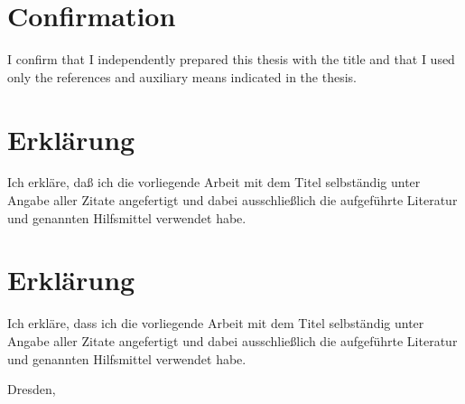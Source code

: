 \ifx\doclanguage\english
	\chapter*{Confirmation}
	I confirm that I independently prepared this thesis with the title 
	\emph{\doctitle}
	and that I used only the references and auxiliary means indicated in the thesis.

\fi
\ifx\doclanguage\german
	\chapter*{Erklärung}
	Ich erkläre, daß ich die vorliegende Arbeit mit dem Titel 
	\emph{\doctitle}
	selbständig unter Angabe aller Zitate angefertigt und dabei ausschließlich die aufgeführte Literatur und genannten Hilfsmittel verwendet habe.
\fi
\ifx\doclanguage\ngerman
	\chapter*{Erklärung}
	Ich erkläre, dass ich die vorliegende Arbeit mit dem Titel 
	\emph{\doctitle}
	selbständig unter Angabe aller Zitate angefertigt und dabei ausschließlich die aufgeführte Literatur und genannten Hilfsmittel verwendet habe.
\fi

\vspace{1.5cm}

\noindent
Dresden, \docdate

\vspace{3.0cm}

\noindent
\authorname

